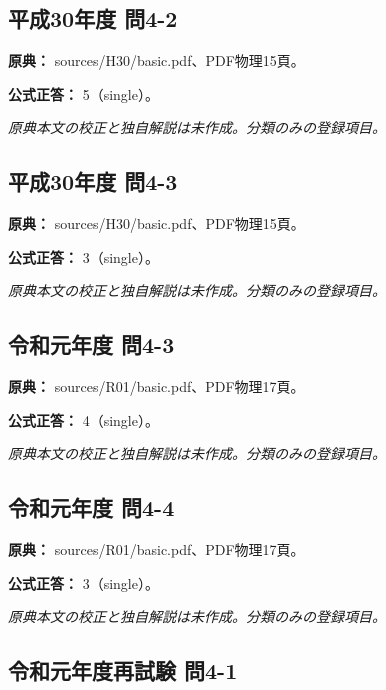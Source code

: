 \subsection{平成30年度 問4-2}
\label{q:h30-reg-basic-4-2}

\noindent\textbf{原典：} sources/H30/basic.pdf、PDF物理15頁。

\textbf{公式正答：} 5（single）。

\par\textit{原典本文の校正と独自解説は未作成。分類のみの登録項目。}

\subsection{平成30年度 問4-3}
\label{q:h30-reg-basic-4-3}

\noindent\textbf{原典：} sources/H30/basic.pdf、PDF物理15頁。

\textbf{公式正答：} 3（single）。

\par\textit{原典本文の校正と独自解説は未作成。分類のみの登録項目。}

\subsection{令和元年度 問4-3}
\label{q:r01-reg-basic-4-3}

\noindent\textbf{原典：} sources/R01/basic.pdf、PDF物理17頁。

\textbf{公式正答：} 4（single）。

\par\textit{原典本文の校正と独自解説は未作成。分類のみの登録項目。}

\subsection{令和元年度 問4-4}
\label{q:r01-reg-basic-4-4}

\noindent\textbf{原典：} sources/R01/basic.pdf、PDF物理17頁。

\textbf{公式正答：} 3（single）。

\par\textit{原典本文の校正と独自解説は未作成。分類のみの登録項目。}

\subsection{令和元年度再試験 問4-1}
\label{q:r01-ret-basic-4-1}


